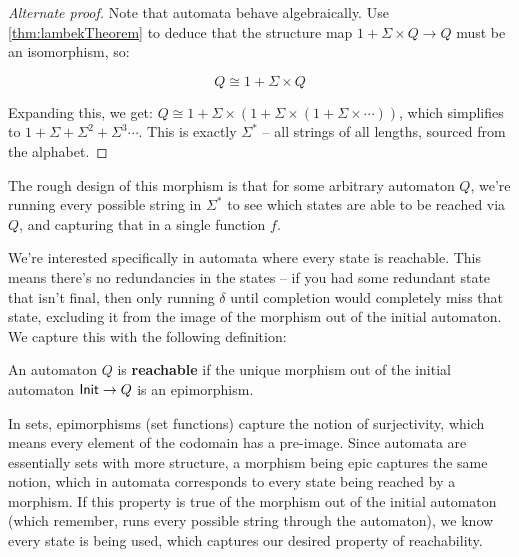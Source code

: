 \begin{proof}[Alternate proof]
    
  Note that automata behave algebraically.
  Use \cref{thm:lambekTheorem} to deduce that the structure map $1 + \Sigma \times Q \rightarrow Q$ must be an isomorphism, so:

  \begin{equation}
        Q \cong 1 + \Sigma \times Q
  \end{equation}

  Expanding this, we get: $Q \cong 1 + \Sigma \times (1 + \Sigma \times (1 + \Sigma \times \cdots))$, which simplifies to $1 + \Sigma + \Sigma^2 + \Sigma^3 \cdots$.
  This is exactly $\Sigma^*$ -- all strings of all lengths, sourced from the alphabet.

\end{proof}

The rough design of this morphism is that for some arbitrary automaton $Q$, we're running every possible string in $\Sigma^*$ to see which states are able to be reached via $Q$, and capturing that in a single function $f$.

We're interested specifically in automata where every state is reachable.
This means there's no redundancies in the states -- if you had some redundant state that isn't final, then only running $\delta$ until completion would completely miss that state, excluding it from the image of the morphism out of the initial automaton.
We capture this with the following definition:

\begin{definition}
    \label{def:reachableAutomaton}
  An automaton $Q$ is \textbf{reachable} if the unique morphism out of the initial automaton $\mathsf{Init} \rightarrow Q$ is an epimorphism.
\end{definition}

In sets, epimorphisms (set functions) capture the notion of surjectivity, which means every element of the codomain has a pre-image.
Since automata are essentially sets with more structure, a morphism being epic captures the same notion, which in automata corresponds to every state being reached by a morphism.
If this property is true of the morphism out of the initial automaton (which remember, runs every possible string through the automaton), we know every state is being used, which captures our desired property of reachability.

